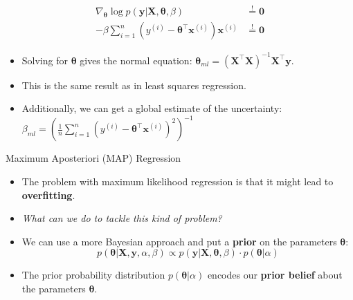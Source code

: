 \begin{frame}
	\begin{align}
		\nabla_{\bm{\theta}} \log p(\bm{y} \vert \bm{X}, \bm{\theta}, \beta)
			&\overset{!}{=} \bm{0} \\
		-\beta \sum_{i=1}^n (y^{(i)} - \bm{\theta}^{\intercal} \bm{x}^{(i)}) \bm{x}^{(i)}
			&\overset{!}{=} \bm{0}
	\end{align}
	
	\begin{itemize}
		\item Solving for $\bm{\theta}$ gives the normal equation: $\bm{\theta}_{ml} = (\bm{X}^{\intercal} \bm{X})^{-1} \bm{X}^{\intercal} \bm{y}$.
		\item This is the same result as in least squares regression.
		\item Additionally, we can get a global estimate of the uncertainty: $\beta_{ml} = \left( \frac{1}{n} \sum_{i=1}^n (y^{(i)} - \bm{\theta}^{\intercal} \bm{x}^{(i)})^2 \right)^{-1}$
	\end{itemize}

\end{frame}


\begin{dwHeaderFrame}{Maximum Aposteriori (MAP) Regression}
	\begin{itemize}
		\item The problem with maximum likelihood regression is that it might lead to \textbf{overfitting}.
		\item \textit{What can we do to tackle this kind of problem?}
		\item We can use a more Bayesian approach and put a \textbf{prior} on the parameters $\bm{\theta}$:
		\begin{equation}
			p(\bm{\theta} \vert \bm{X}, \bm{y}, \alpha, \beta) \propto p(\bm{y} \vert \bm{X}, \bm{\theta}, \beta) \cdot p(\bm{\theta} \vert \alpha)
		\end{equation}
		\item The prior probability distribution $p(\bm{\theta} \vert \alpha)$ encodes our \textbf{prior belief} about the parameters $\bm{\theta}$.
	\end{itemize}
	
\end{dwHeaderFrame}



